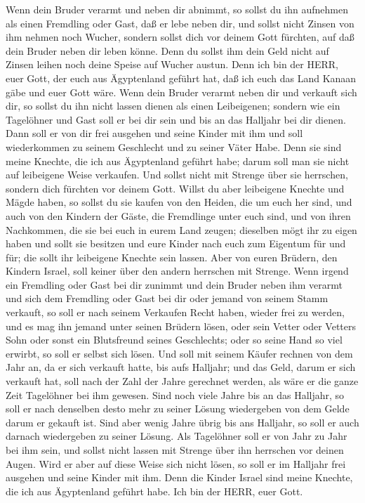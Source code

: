  Wenn dein Bruder verarmt und neben dir abnimmt, so sollst
du ihn aufnehmen als einen Fremdling oder Gast, daß er lebe neben dir,
 und sollst nicht Zinsen von ihm nehmen noch Wucher,
sondern sollst dich vor deinem Gott fürchten, auf daß dein Bruder neben
dir leben könne.  Denn du sollst ihm dein Geld nicht auf
Zinsen leihen noch deine Speise auf Wucher austun.  Denn
ich bin der HERR, euer Gott, der euch aus Ägyptenland geführt hat, daß
ich euch das Land Kanaan gäbe und euer Gott wäre.  Wenn
dein Bruder verarmt neben dir und verkauft sich dir, so sollst du ihn
nicht lassen dienen als einen Leibeigenen;  sondern wie ein
Tagelöhner und Gast soll er bei dir sein und bis an das Halljahr bei dir
dienen.  Dann soll er von dir frei ausgehen und seine
Kinder mit ihm und soll wiederkommen zu seinem Geschlecht und zu seiner
Väter Habe.  Denn sie sind meine Knechte, die ich aus
Ägyptenland geführt habe; darum soll man sie nicht auf leibeigene Weise
verkaufen.  Und sollst nicht mit Strenge über sie
herrschen, sondern dich fürchten vor deinem Gott.  Willst
du aber leibeigene Knechte und Mägde haben, so sollst du sie kaufen von
den Heiden, die um euch her sind,  und auch von den Kindern
der Gäste, die Fremdlinge unter euch sind, und von ihren Nachkommen, die
sie bei euch in eurem Land zeugen; dieselben mögt ihr zu eigen haben
 und sollt sie besitzen und eure Kinder nach euch zum
Eigentum für und für; die sollt ihr leibeigene Knechte sein lassen. Aber
von euren Brüdern, den Kindern Israel, soll keiner über den andern
herrschen mit Strenge.  Wenn irgend ein Fremdling oder Gast
bei dir zunimmt und dein Bruder neben ihm verarmt und sich dem Fremdling
oder Gast bei dir oder jemand von seinem Stamm verkauft, 
so soll er nach seinem Verkaufen Recht haben, wieder frei zu werden, und
es mag ihn jemand unter seinen Brüdern lösen,  oder sein
Vetter oder Vetters Sohn oder sonst ein Blutsfreund seines Geschlechts;
oder so seine Hand so viel erwirbt, so soll er selbst sich lösen.
 Und soll mit seinem Käufer rechnen von dem Jahr an, da er
sich verkauft hatte, bis aufs Halljahr; und das Geld, darum er sich
verkauft hat, soll nach der Zahl der Jahre gerechnet werden, als wäre er
die ganze Zeit Tagelöhner bei ihm gewesen.  Sind noch viele
Jahre bis an das Halljahr, so soll er nach denselben desto mehr zu
seiner Lösung wiedergeben von dem Gelde darum er gekauft ist.
 Sind aber wenig Jahre übrig bis ans Halljahr, so soll er
auch darnach wiedergeben zu seiner Lösung.  Als Tagelöhner
soll er von Jahr zu Jahr bei ihm sein, und sollst nicht lassen mit
Strenge über ihn herrschen vor deinen Augen.  Wird er aber
auf diese Weise sich nicht lösen, so soll er im Halljahr frei ausgehen
und seine Kinder mit ihm.  Denn die Kinder Israel sind
meine Knechte, die ich aus Ägyptenland geführt habe. Ich bin der HERR,
euer Gott.

